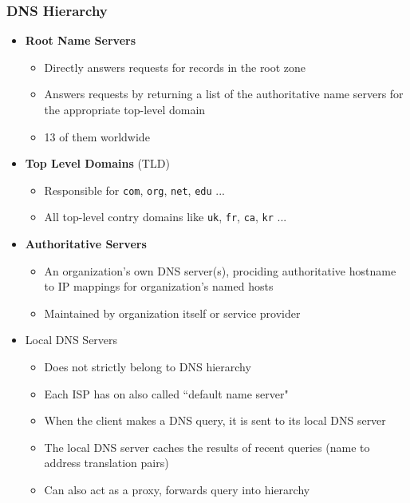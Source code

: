 \subsubsection{DNS Hierarchy}
\begin{itemize}
	\item \textbf{Root Name Servers}
	\begin{itemize}
		\item Directly answers requests for records in the root zone
		\item Answers requests by returning a list of the authoritative name servers for the appropriate top-level domain
		\item 13 of them worldwide
	\end{itemize}
	\item \textbf{Top Level Domains} (TLD)
	\begin{itemize}
		\item Responsible for \texttt{com}, \texttt{org}, \texttt{net}, \texttt{edu} ...
		\item All top-level contry domains like \texttt{uk}, \texttt{fr}, \texttt{ca}, \texttt{kr} ...
	\end{itemize}
	\item \textbf{Authoritative Servers}
	\begin{itemize}
		\item An organization's own DNS server(s), prociding authoritative hostname to IP mappings for organization's named hosts
		\item Maintained by organization itself or service provider
	\end{itemize}
	\item Local DNS Servers
	\begin{itemize}
		\item Does not strictly belong to DNS hierarchy
		\item Each ISP has on also called ``default name server"
		\item When the client makes a DNS query, it is sent to its local DNS server
		\item The local DNS server caches the results of recent queries (name to address translation pairs)
		\item Can also act as a proxy, forwards query into hierarchy
	\end{itemize}
\end{itemize}

